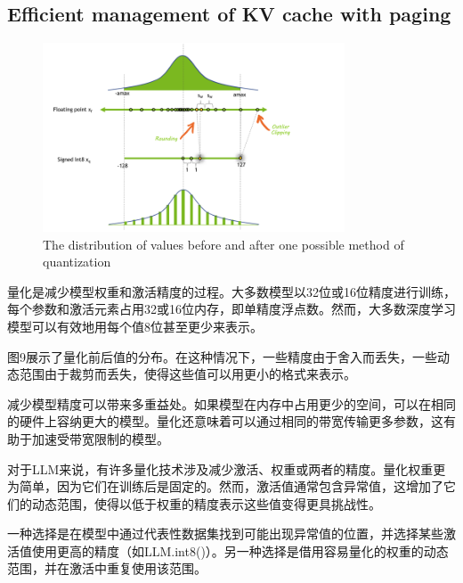\documentclass[twocolumn, 10pt]{article} %
\theoremstyle{remark}
\begin{document}
\subsection{Efficient management of KV cache with paging}
\begin{figure}[ht]
    \centering
    \includegraphics[width=0.8\textwidth]{quantization-value-distribution.png}
    \caption{The distribution of values before and after one possible method of quantization}
\end{figure}

量化是减少模型权重和激活精度的过程。大多数模型以32位或16位精度进行训练，每个参数和激活元素占用32或16位内存，即单精度浮点数。然而，大多数深度学习模型可以有效地用每个值8位甚至更少来表示。

图9展示了量化前后值的分布。在这种情况下，一些精度由于舍入而丢失，一些动态范围由于裁剪而丢失，使得这些值可以用更小的格式来表示。


减少模型精度可以带来多重益处。如果模型在内存中占用更少的空间，可以在相同的硬件上容纳更大的模型。量化还意味着可以通过相同的带宽传输更多参数，这有助于加速受带宽限制的模型。

对于LLM来说，有许多量化技术涉及减少激活、权重或两者的精度。量化权重更为简单，因为它们在训练后是固定的。然而，激活值通常包含异常值，这增加了它们的动态范围，使得以低于权重的精度表示这些值变得更具挑战性。

一种选择是在模型中通过代表性数据集找到可能出现异常值的位置，并选择某些激活值使用更高的精度（如LLM.int8()）。另一种选择是借用容易量化的权重的动态范围，并在激活中重复使用该范围。
\end{document}
